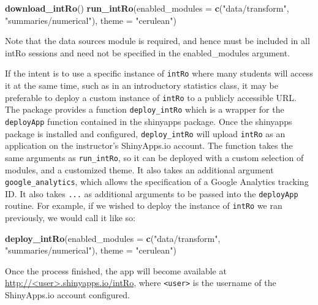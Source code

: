 \documentclass[12pt,]{article}
\newenvironment{Shaded}{\begin{snugshade}}{\end{snugshade}}
\newcommand{\KeywordTok}[1]{\textcolor[rgb]{0.13,0.29,0.53}{\textbf{{#1}}}}
\newcommand{\DataTypeTok}[1]{\textcolor[rgb]{0.13,0.29,0.53}{{#1}}}
\newcommand{\StringTok}[1]{\textcolor[rgb]{0.31,0.60,0.02}{{#1}}}
\newcommand{\NormalTok}[1]{{#1}}
\begin{document}
\begin{Shaded}
\begin{Highlighting}[]
\KeywordTok{download_intRo}\NormalTok{()}
\KeywordTok{run_intRo}\NormalTok{(}\DataTypeTok{enabled_modules =} \KeywordTok{c}\NormalTok{(}\StringTok{"data/transform"}\NormalTok{, }\StringTok{"summaries/numerical"}\NormalTok{), }
          \DataTypeTok{theme =} \StringTok{"cerulean"}\NormalTok{)}
\end{Highlighting}
\end{Shaded}

Note that the data sources module is required, and hence must be
included in all intRo sessions and need not be specified in the
enabled\_modules argument.

If the intent is to use a specific instance of \texttt{intRo} where many
students will access it at the same time, such as in an introductory
statistics class, it may be preferable to deploy a custom instance of
\texttt{intRo} to a publicly accessible URL. The package provides a
function \texttt{deploy\_intRo} which is a wrapper for the
\texttt{deployApp} function contained in the shinyapps package. Once the
shinyapps package is installed and configured, \texttt{deploy\_intRo}
will upload \texttt{intRo} as an application on the instructor's
ShinyApps.io account. The function takes the same arguments as
\texttt{run\_intRo}, so it can be deployed with a custom selection of
modules, and a customized theme. It also takes an additional argument
\texttt{google\_analytics}, which allows the specification of a Google
Analytics tracking ID. It also takes \texttt{...} as additional
arguments to be passed into the \texttt{deployApp} routine. For example,
if we wished to deploy the instance of \texttt{intRo} we ran previously,
we would call it like so:

\begin{Shaded}
\begin{Highlighting}[]
\KeywordTok{deploy_intRo}\NormalTok{(}\DataTypeTok{enabled_modules =} \KeywordTok{c}\NormalTok{(}\StringTok{"data/transform"}\NormalTok{, }\StringTok{"summaries/numerical"}\NormalTok{), }
             \DataTypeTok{theme =} \StringTok{"cerulean"}\NormalTok{)}
\end{Highlighting}
\end{Shaded}

Once the process finished, the app will become available at
\url{http://<user>.shinyapps.io/intRo}, where
\texttt{\textless{}user\textgreater{}} is the username of the
ShinyApps.io account configured.
\end{document}

